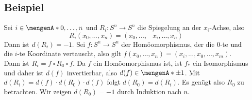 \subsection[Beispiel: Abbildungsgrad der Spiegelung $R_i \colon S^n \to S^n$]{Beispiel} %
\label{sub:105}
Sei $i \in \set{0, \ldots ,n}$ und $R_i \colon S^n \to S^n$ die Spiegelung  an der $x_i$-Achse, also 
\[
	R_i(x_0, \ldots , x_n) = (x_0, \ldots , - x_i, \ldots , x_n)
\]
Dann ist $d(R_i) = -1$.
Sei $f \colon S^n \to S^n$ der Homöomorphismus, der die $0$-te und die $i$-te Koordinate vertauscht, also gilt $f(x_0, \ldots , x_n) = (x_i, \ldots , x_0, \ldots , x_m)$. 
Dann ist $R_i = f \circ R_0 \circ f$. Da $f$ ein Homöomorphismus ist, ist $f_*$ ein Isomorphismus und daher ist $d(f)$ invertierbar, also $d(f) \in \set{\pm 1}$. Mit 
$d(R_i) = d(f) \cdot d(R_0) \cdot d(f)$ folgt $d(R_0)=d(R_i)$. Es genügt also $R_0$ zu betrachten.
Wir zeigen $d(R_0)= -1$ durch Induktion nach $n$.
